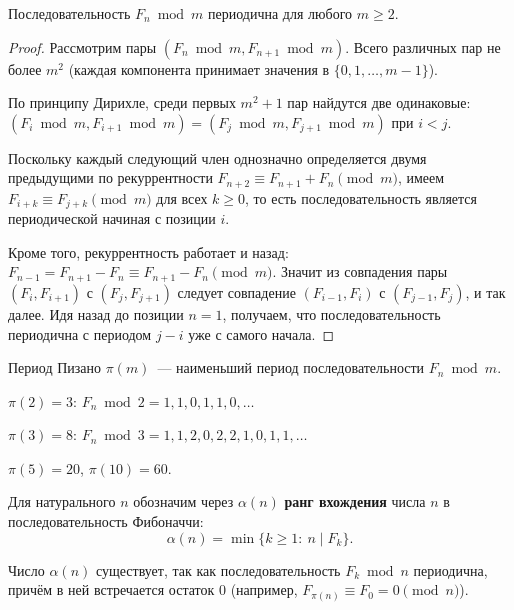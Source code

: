 \documentclass[12pt]{article}
\begin{document}
	\begin{theorem}
		Последовательность $F_n \bmod m$ периодична для любого $m \geqslant 2$.
	\end{theorem}
	
	\begin{proof}
		Рассмотрим пары $(F_n \bmod m, F_{n+1} \bmod m)$. Всего различных пар не более $m^2$ (каждая компонента принимает значения в $\{0, 1, \dots, m-1\}$).
		
		По принципу Дирихле, среди первых $m^2 + 1$ пар найдутся две одинаковые: $(F_i \bmod m, F_{i+1} \bmod m) = (F_j \bmod m, F_{j+1} \bmod m)$ при $i < j$.
		
		Поскольку каждый следующий член однозначно определяется двумя предыдущими по рекуррентности $F_{n+2} \equiv F_{n+1} + F_n \pmod{m}$, имеем $F_{i+k} \equiv F_{j+k} \pmod{m}$ для всех $k \geqslant 0$, то есть последовательность является периодической начиная с позиции $i$.
		
		Кроме того, рекуррентность работает и назад: $F_{n-1} = F_{n+1} - F_n \equiv F_{n+1} - F_n \pmod{m}$. Значит из совпадения пары $(F_i, F_{i+1})$ с $(F_j, F_{j+1})$ следует совпадение $(F_{i-1}, F_i)$ с $(F_{j-1}, F_j)$, и так далее. Идя назад до позиции $n = 1$, получаем, что последовательность периодична с периодом $j - i$ уже с самого начала.
	\end{proof}
	
	\begin{definition}
		Период Пизано $\pi(m)$~--- наименьший период последовательности $F_n \bmod m$.
	\end{definition}
	
	\begin{example}
		$\pi(2) = 3$: $F_n \bmod 2 = 1, 1, 0, 1, 1, 0, \dots$
		
		$\pi(3) = 8$: $F_n \bmod 3 = 1, 1, 2, 0, 2, 2, 1, 0, 1, 1, \dots$
		
		$\pi(5) = 20$, $\pi(10) = 60$.
	\end{example}
	
	\begin{definition}
    	Для натурального $n$ обозначим через $\alpha(n)$ \textbf{ранг вхождения} числа $n$ в последовательность Фибоначчи:
    	\[
    	\alpha(n)=\min\{k \geqslant 1:\ n \mid F_k\}.
    	\]
    \end{definition}
    
    \begin{note}
    	Число $\alpha(n)$ существует, так как последовательность $F_k \bmod n$ периодична, причём в ней встречается остаток $0$ (например, $F_{\pi(n)} \equiv F_0 = 0 \pmod n$).
    \end{note}
    
\end{document}
